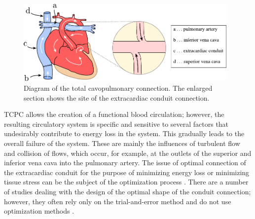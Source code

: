 \begin{figure}[h]
	\centering
	\includegraphics[width=0.97\textwidth]{figures/heart.pdf}
	\vspace{5mm}
	\caption{Diagram of the total cavopulmonary connection. The enlarged section shows the site of the extracardiac conduit connection.}
	\label{fig:tcpc}

\end{figure}

TCPC allows the creation of a functional blood circulation; however, the resulting circulatory system is specific and sensitive to several factors that undesirably contribute to energy loss in the system. This gradually leads to the overall failure of the system. These are mainly the influences of turbulent flow and collision of flows, which occur, for example, at the outlets of the superior and inferior vena cava into the pulmonary artery. The issue of optimal connection of the extracardiac conduit for the purpose of minimizing energy loss or minimizing tissue stress can be the subject of the optimization process \cite{Chaloup, vanBake, Wang}. There are a number of studies dealing with the design of the optimal shape of the conduit connection; however, they often rely only on the trial-and-error method and do not use optimization methods \cite{Rijnberg2018, Porfiryev2020, Tang2014}.

